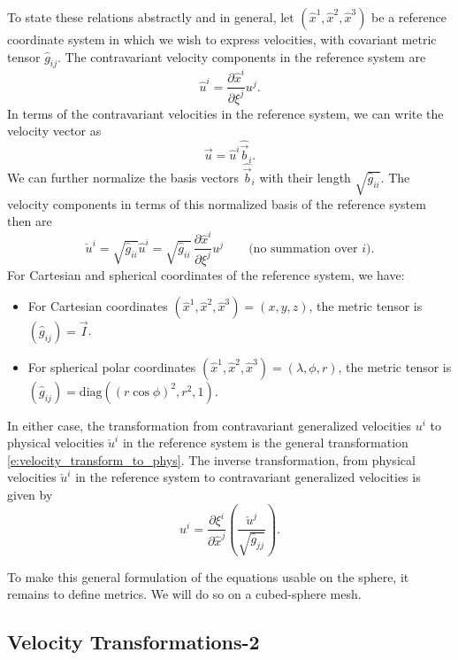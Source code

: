 \documentclass{report}
\begin{document}
To state these relations abstractly and in general, let $(\hat x^1, \hat x^2, \hat x^3)$ be a reference coordinate system in which we wish to express velocities, with covariant metric tensor $\hat g_{ij}$. The contravariant velocity components in the reference system are 
\begin{equation}\label{e:velocity_transform_to_phys}
\hat u^i = \frac{\partial \hat x^i}{\partial \xi^j} u^j.
\end{equation}
In terms of the contravariant velocities in the reference system, we can write the velocity vector as
\[
\vec{u} = \hat u^i \hat{\vec{b}}_i.
\]
We can further normalize the basis vectors $\hat{\vec{b}}_i$ with their length $\sqrt{\hat g_{ii}}$. The velocity components in terms of this normalized basis of the reference system then are
\begin{equation}\label{e:velocity_transform_to_phys}
\check{u}^i = \sqrt{\hat g_{ii}}\hat{u}^i = \sqrt{\hat g_{ii}} \, \frac{\partial \hat x^i}{\partial \xi^j} u^j \qquad \text{(no summation over $i$}).
\end{equation}
For Cartesian and spherical coordinates of the reference system, we have:
\begin{itemize}
\item For Cartesian coordinates $(\hat x^1, \hat x^2, \hat x^3)=(x, y, z)$, the metric tensor is $(\hat g_{ij}) = \vec{I}$.
\item For spherical polar coordinates $(\hat x^1, \hat x^2, \hat x^3)=(\lambda, \phi, r)$, the metric tensor is $(\hat g_{ij}) = \mathrm{diag}\left((r \cos \phi)^2, r^2,  1\right)$. 
\end{itemize}
In either case, the transformation from contravariant generalized velocities $u^i$ to physical velocities $\check{u}^i$ in the reference system is the general transformation \eqref{e:velocity_transform_to_phys}. The inverse transformation, from physical velocities $\check{u}^i$ in the reference system to contravariant generalized velocities is given by
\begin{equation}\label{e:velocity_transform_from_phys}
    u^i = \frac{\partial \xi^i}{\partial \hat x^j} \left(\frac{\check{u}^j}{\sqrt{\hat g_{jj}}}\right).
\end{equation}

To make this general formulation of the equations usable on the sphere, it remains to define metrics. We will do so on a cubed-sphere mesh.



\subsection{Velocity Transformations-2}
\end{document}
